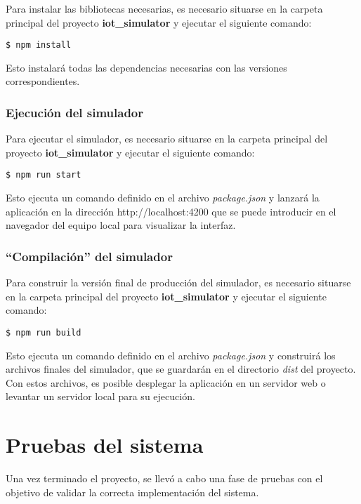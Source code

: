 Para instalar las bibliotecas necesarias, es necesario situarse en la carpeta principal del proyecto \textbf{iot\_simulator} y ejecutar el siguiente comando:
\begin{verbatim}
$ npm install
\end{verbatim}

Esto instalará todas las dependencias necesarias con las versiones correspondientes.

\subsubsection{Ejecución del simulador}
\label{subsubsec:EjecucionSimulador}
Para ejecutar el simulador, es necesario situarse en la carpeta principal del proyecto \textbf{iot\_simulator} y ejecutar el siguiente comando:

\begin{verbatim}
$ npm run start
\end{verbatim}

Esto ejecuta un comando definido en el archivo \textit{package.json} y lanzará la aplicación en la dirección http://localhost:4200 que se puede introducir en el navegador del equipo local para visualizar la interfaz.

\subsubsection{``Compilación'' del simulador}
\label{subsubsec:EjecucionSimulador}
Para construir la versión final de producción del simulador, es necesario situarse en la carpeta principal del proyecto \textbf{iot\_simulator} y ejecutar el siguiente comando:

\begin{verbatim}
$ npm run build
\end{verbatim}

Esto ejecuta un comando definido en el archivo \textit{package.json} y construirá los archivos finales del simulador, que se guardarán en el directorio \textit{dist} del proyecto. Con estos archivos, es posible desplegar la aplicación en un servidor web o levantar un servidor local para su ejecución.

\section{Pruebas del sistema}
\label{sec:Pruebas}
Una vez terminado el proyecto, se llevó a cabo una fase de pruebas con el objetivo de validar la correcta implementación del sistema.

